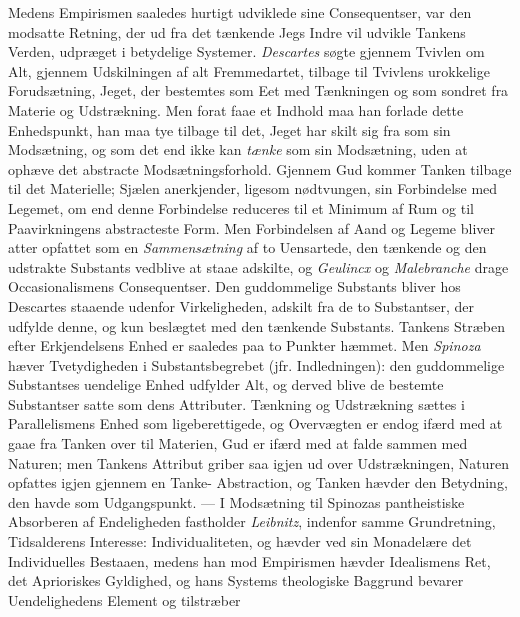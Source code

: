 \documentclass[12pt,a4paper]{book}
\newcommand{\opage}[1]{\marginnote{\footnotesize\textit{[#1]}}}
\begin{document}
Medens Empirismen saaledes hurtigt udviklede sine Consequentser, var
den modsatte Retning, der ud fra det tænkende Jegs Indre vil udvikle
Tankens Verden, udpræget i betydelige Systemer. \emph{Descartes} søgte
gjennem Tvivlen om Alt, gjennem Udskilningen af alt Fremmedartet,
tilbage til Tvivlens urokkelige Forudsætning, Jeget, der bestemtes som
Eet med Tænkningen og som sondret fra Materie og Udstrækning. Men
forat faae et Indhold maa han forlade dette Enhedspunkt, han maa tye
tilbage til det, Jeget har skilt sig fra som sin Modsætning, og som
det end ikke kan \emph{tænke} som sin Modsætning, uden at ophæve det
abstracte Modsætningsforhold. Gjennem Gud kommer Tanken tilbage til
det Materielle; Sjælen anerkjender, ligesom nødtvungen, sin
Forbindelse med Legemet, om end denne Forbindelse reduceres til et
Minimum af Rum og til Paavirkningens abstracteste Form. Men
Forbindelsen af Aand og Legeme bliver atter opfattet som en
\emph{Sammensætning} af to Uensartede, den tænkende og den udstrakte
Substants vedblive at staae adskilte, og \emph{Geulincx} og
\emph{Malebranche} drage Occasionalismens Consequentser. Den
guddommelige Substants bliver hos Descartes staaende udenfor
Virkeligheden, adskilt fra de to Substantser, der udfylde denne, og
kun beslægtet med den tænkende Substants. Tankens Stræben efter
Erkjendelsens Enhed er saaledes paa to Punkter hæmmet. Men
\emph{Spinoza} hæver Tvetydigheden i Substantsbegrebet (jfr.
Indledningen): den guddommelige Substantses uendelige Enhed udfylder
Alt, og derved blive de bestemte Substantser satte som dens
Attributer. Tænkning og Udstrækning sættes i Parallelismens Enhed som
ligeberettigede, og Overvægten er endog ifærd med at gaae fra Tanken
over til Materien, Gud er ifærd med at falde sammen med Naturen; men
Tankens Attribut griber saa igjen ud over Udstrækningen, Naturen
opfattes igjen gjennem en Tanke-%
\opage{9}Abstraction, og Tanken hævder den Betydning, den havde som
Udgangspunkt. --- I Modsætning til Spinozas pantheistiske Absorberen
af Endeligheden fastholder \emph{Leibnitz}, indenfor samme
Grundretning, Tidsalderens Interesse: Individualiteten, og hævder ved
sin Monadelære det Individuelles Bestaaen, medens han mod Empirismen
hævder Idealismens Ret, det Aprioriskes Gyldighed, og hans Systems
theologiske Baggrund bevarer Uendelighedens Element og tilstræber
\end{document}
